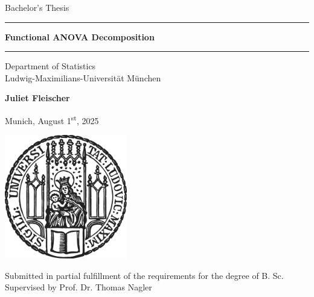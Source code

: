 \documentclass[12pt]{article}
\newcommand{\mytitle}{Functional ANOVA Decomposition}
\newcommand{\myname}{Juliet Fleischer}
\newcommand{\mysupervisor}{Prof. Dr. Thomas Nagler}
\begin{document}
 
\begin{titlepage}
\begin{center}
    
\LARGE
Bachelor's Thesis
    
\vspace{0.5cm}
      
\rule{\textwidth}{1.5pt}
\LARGE
\textbf{\mytitle}
\rule{\textwidth}{1.5pt}
   
\vspace{0.5cm}
      
\large
Department of Statistics \\
Ludwig-Maximilians-Universität München 

\vfill

\Large
\textbf{\myname}

\vfill

\large
Munich, August 1\textsuperscript{st}, 2025

\vfill

\includegraphics[width = 0.4\textwidth]{sigillum.png}

\vfill

\normalsize
Submitted in partial fulfillment of the requirements for the degree of B. Sc.
\\

Supervised by \mysupervisor

\end{center}
\end{titlepage}


\newpage
\end{document}
